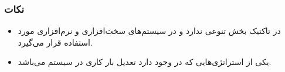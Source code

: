 \subsubsection*{نکات}

\begin{itemize}
    \item در تاکتیک  بخش  تنوعی ندارد و در سیستم‌های
    سخت‌افزاری و نرم‌افزاری مورد استفاده قرار می‌گیرد.
    \item یکی از استراتژی‌هایی که در  وجود دارد تعدیل بار کاری
    در سیستم می‌باشد.
\end{itemize}

\subsubsection{}

